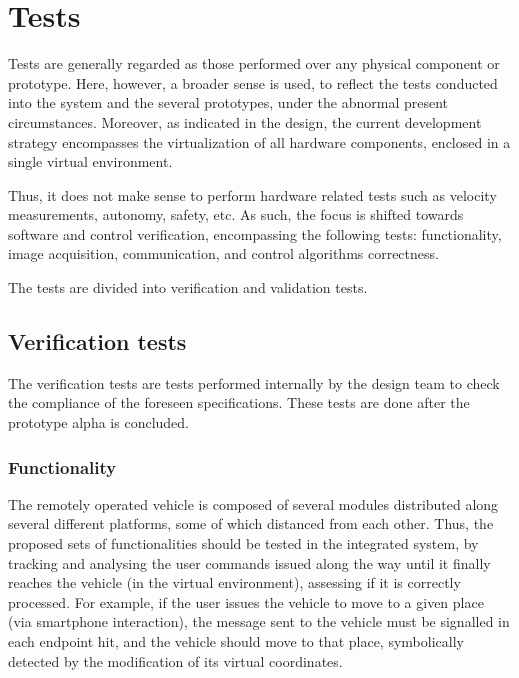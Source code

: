 \section{Tests}%
\label{sec:org3e2776f}
Tests are generally regarded as those performed over any physical
component or prototype. Here, however, a broader sense is used, to reflect the
tests conducted into the system and the several prototypes, under the abnormal
present circumstances.
Moreover, as indicated in the design, the current development
strategy encompasses the virtualization of all hardware components, enclosed
in a single virtual environment.

Thus, it does not make sense to perform
hardware related tests such as velocity measurements, autonomy, safety, etc. As
such, the focus is shifted towards software and control verification,
encompassing the following tests: functionality, image acquisition,
communication, and control algorithms correctness.

The tests are divided into verification and validation tests.
\subsection{Verification tests}%
\label{sec:orge9c79e2}
The verification tests are tests performed internally by the design team to
check the compliance of the foreseen specifications. These tests are done after
the prototype alpha is concluded.

\subsubsection{Functionality}%
\label{sec:functionality}
The remotely operated vehicle is composed of several modules distributed along
several different platforms, some of which distanced from each other. Thus, the
proposed sets of functionalities should be tested in the integrated system, by
tracking and analysing the user commands issued along the way until it finally
reaches the vehicle (in the virtual environment), assessing if it is correctly
processed. For example, if the user issues the vehicle to move to a given place
(via smartphone interaction), the message sent to the vehicle must be signalled
in each endpoint hit, and the vehicle should move to that place, symbolically
detected by the modification of its virtual coordinates.

